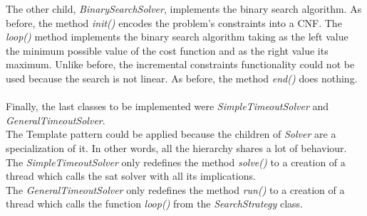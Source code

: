 The other child, \emph{BinarySearchSolver}, implements the binary search algorithm. As before, the method \emph{init()} encodes the problem's constraints into a CNF. The \emph{loop()} method implements the binary search algorithm taking as the left value the minimum possible value of the cost function and as the right value its maximum. Unlike before, the incremental constraints functionality could not be used because the search is not linear. As before, the method \emph{end()} does nothing.  \\\\
Finally, the last classes to be implemented were \emph{SimpleTimeoutSolver} and \emph{GeneralTimeoutSolver}. \\
The Template pattern \cite{Gamma} could be applied because the children of \emph{Solver} are a specialization of it. In other words, all the hierarchy shares a lot of behaviour.  \\
The \emph{SimpleTimeoutSolver} only redefines the method \emph{solve()} to a creation of a thread which calls the sat solver with all its implications. \\
The \emph{GeneralTimeoutSolver} only redefines the method \emph{run()} to a creation of a thread which calls the function \emph{loop()} from the \emph{SearchStrategy} class.  

